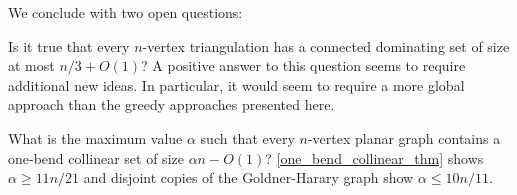 \documentclass{article}
\theoremstyle{definition}
\begin{document}
We conclude with two open questions:

\begin{compactenum}
  \item Is it true that every $n$-vertex triangulation has a connected dominating set of size at most $n/3+O(1)$?  A positive answer to this question seems to require additional new ideas.  In particular, it would seem to require a more global approach than the greedy approaches presented here.

  \item What is the maximum value $\alpha$ such that every $n$-vertex planar graph contains a one-bend collinear set of size $\alpha n-O(1)$?  \cref{one_bend_collinear_thm} shows $\alpha \ge 11n/21$ and disjoint copies of the Goldner-Harary graph show $\alpha \le 10n/11$.

\end{compactenum}








% 
\end{document}
